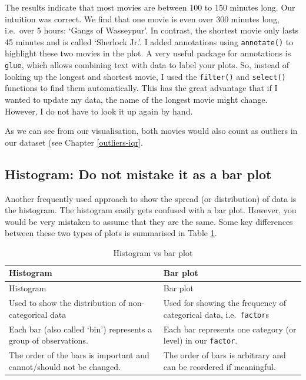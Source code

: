 \documentclass[
]{book}
\begin{document}
The results indicate that most movies are between 100 to 150 minutes long. Our intuition was correct. We find that one movie is even over 300 minutes long, i.e.~over 5 hours: `Gangs of Wasseypur'. In contrast, the shortest movie only lasts 45 minutes and is called `Sherlock Jr.'. I added annotations using \texttt{annotate()} to highlight these two movies in the plot. A very useful package for annotations is \texttt{glue}, which allows combining text with data to label your plots. So, instead of looking up the longest and shortest movie, I used the \texttt{filter()} and \texttt{select()} functions to find them automatically. This has the great advantage that if I wanted to update my data, the name of the longest movie might change. However, I do not have to look it up again by hand.

As we can see from our visualisation, both movies would also count as outliers in our dataset (see Chapter \ref{outliers-iqr}.

\hypertarget{histogram-do-not-mistake-it-as-a-bar-plot}{%
\subsection{Histogram: Do not mistake it as a bar plot}\label{histogram-do-not-mistake-it-as-a-bar-plot}}

Another frequently used approach to show the spread (or distribution) of data is the histogram. The histogram easily gets confused with a bar plot. However, you would be very mistaken to assume that they are the same. Some key differences between these two types of plots is summarised in Table \ref{tab:histogram-vs-bar-plot}.

\begin{longtable}[]{@{}
  >{\raggedright\arraybackslash}p{}
  >{\raggedright\arraybackslash}p{}@{}}
\caption{\label{tab:histogram-vs-bar-plot} Histogram vs bar plot}\tabularnewline
\toprule
Histogram & Bar plot \\
\midrule
\endfirsthead
\toprule
Histogram & Bar plot \\
\midrule
\endhead
Used to show the distribution of non-categorical data & Used for showing the frequency of categorical data, i.e.~\texttt{factor}s \\
Each bar (also called `bin') represents a group of observations. & Each bar represents one category (or level) in our \texttt{factor}. \\
The order of the bars is important and cannot/should not be changed. & The order of bars is arbitrary and can be reordered if meaningful. \\
\bottomrule
\end{longtable}
\end{document}
